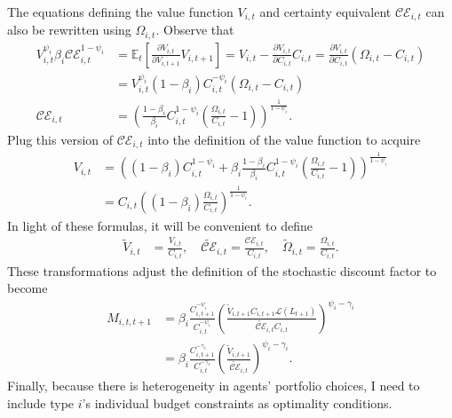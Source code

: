 \documentclass[12 pt, oneside]{article}
\theoremstyle{definition}
\theoremstyle{definition}
\theoremstyle{definition}
\newcommand{\E}{\mathbb{E}}
\newcommand{\calC}{\mathcal{C}}
\newcommand{\calE}{\mathcal{E}}
\newcommand{\calL}{\mathcal{L}}
\begin{document}
The equations defining the value function $V_{i, t}$ and certainty equivalent $\calC\calE_{i, t}$ can also be rewritten using $\Omega_{i, t}$. Observe that
\begin{align*}
  V_{i, t}^{\psi_i} \beta_i \calC\calE_{i, t}^{1 - \psi_i} & = \E_t\left[\frac{\partial V_{i, t}}{\partial V_{i, t + 1}}V_{i, t + 1}\right] = V_{i, t} - \frac{\partial V_{i, t}}{\partial C_{i, t}}C_{i, t} = \frac{\partial V_{i, t}}{\partial C_{i, t}}(\Omega_{i, t} - C_{i, t})\\
                                                              & = V_{i, t}^{\psi_i} (1 - \beta_i)C_{i, t}^{ - \psi_i}(\Omega_{i, t} - C_{i, t})\\
  \calC\calE_{i, t} & = \left(\frac{1 - \beta_i}{\beta_i}C_{i, t}^{1 - \psi_i}\left(\frac{\Omega_{i, t}}{C_{i, t}} - 1\right)\right)^{\frac{1}{1 - \psi_i}}.
\end{align*}
Plug this version of $\calC\calE_{i, t}$ into the definition of the value function to acquire
\begin{align*}
  V_{i, t} & = \left((1 - \beta_i)C_{i, t}^{1 - \psi_i} + \beta_i \frac{1 - \beta_i}{\beta_i}C_{i, t}^{1 - \psi_i}\left(\frac{\Omega_{i, t}}{C_{i, t}} - 1\right)\right)^{\frac{1}{1 - \psi_i}}\\
      & = C_{i, t} \left((1 - \beta_i)\frac{\Omega_{i, t}}{C_{i, t}}\right)^{\frac{1}{1 - \psi_i}}.
\end{align*}
In light of these formulas, it will be convenient to define
\begin{align}
  \tilde{V}_{i, t} & = \frac{V_{i, t}}{C_{i, t}}, \quad \tilde{\calC\calE}_{i, t} = \frac{\calC\calE_{i, t}}{C_{i, t}}, \quad \tilde{\Omega}_{i, t} = \frac{\Omega_{i, t}}{C_{i, t}}.
\end{align}
These transformations adjust the definition of the stochastic discount factor to become
\begin{align*}
  M_{i, t, t + 1} & = \beta_i\frac{C_{i, t + 1}^{ - \psi_i}}{C_{i, t}^{- \psi_i}}\left(\frac{\tilde{V}_{i, t + 1} C_{i, t + 1}\calL(L_{t + 1})}{\tilde{\calC\calE}_{i, t} C_{i, t}}\right)^{ \psi_i - \gamma_i}\\
               & = \beta_i \frac{C_{i, t + 1}^{- \gamma_i } }{C_{i, t}^{-\gamma_i}}\left(\frac{\tilde{V}_{i, t + 1}}{\tilde{\calC\calE}_{i, t}}\right)^{ \psi_i - \gamma_i}.
\end{align*}
Finally, because there is heterogeneity in agents' portfolio choices, I need to include type $i$'s individual budget constraints as optimality conditions.
\end{document}
